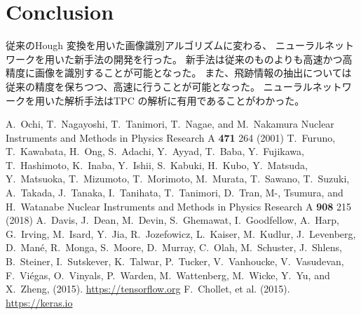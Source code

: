 \documentclass{jps-cp}
\begin{document}
\section{Conclusion}
従来のHough 変換を用いた画像識別アルゴリズムに変わる、
ニューラルネットワークを用いた新手法の開発を行った。
新手法は従来のものよりも高速かつ高精度に画像を識別することが可能となった。
また、飛跡情報の抽出については従来の精度を保ちつつ、高速に行うことが可能となった。
ニューラルネットワークを用いた解析手法はTPC の解析に有用であることがわかった。

\begin{thebibliography}{9}
  A.~Ochi, T.~Nagayoshi, T.~Tanimori, T.~Nagae, and M.~Nakamura
  Nuclear Instruments and Methods in Physics Research A \textbf{471} 264 (2001)
  T.~Furuno, T.~Kawabata, H.~Ong, S.~Adachi, Y.~Ayyad, T.~Baba, Y.~Fujikawa, T.~Hashimoto, K.~Inaba, Y.~Ishii,
  S.~Kabuki, H.~Kubo, Y.~Matsuda, Y.~Matsuoka, T.~Mizumoto, T.~Morimoto, M.~Murata, T.~Sawano, T.~Suzuki, A.~Takada,
  J.~Tanaka, I.~Tanihata, T.~Tanimori, D.~Tran, M-, Tsumura, and H.~Watanabe
  Nuclear Instruments and Methods in Physics Research A \textbf{908} 215 (2018)
  A.~Davis, J.~Dean, M.~Devin, S.~Ghemawat, I.~Goodfellow, A.~Harp, G.~Irving,
  M.~Isard, Y.~Jia, R.~Jozefowicz, L.~Kaiser, M.~Kudlur, J.~Levenberg,
  D.~Man\'{e}, R.~Monga, S.~Moore, D.~Murray, C.~Olah, M.~Schuster, J.~Shlens,
  B.~Steiner, I.~Sutskever, K.~Talwar, P.~Tucker, V.~Vanhoucke, V.~Vasudevan,
  F.~Vi\'{e}gas, O.~Vinyals, P.~Warden, M.~Wattenberg, M.~Wicke, Y.~Yu, and
  X.~Zheng, (2015).
  \url{https://tensorflow.org}
  F.~Chollet, et al. (2015). \url{https://keras.io}

\end{thebibliography}
\end{document}
